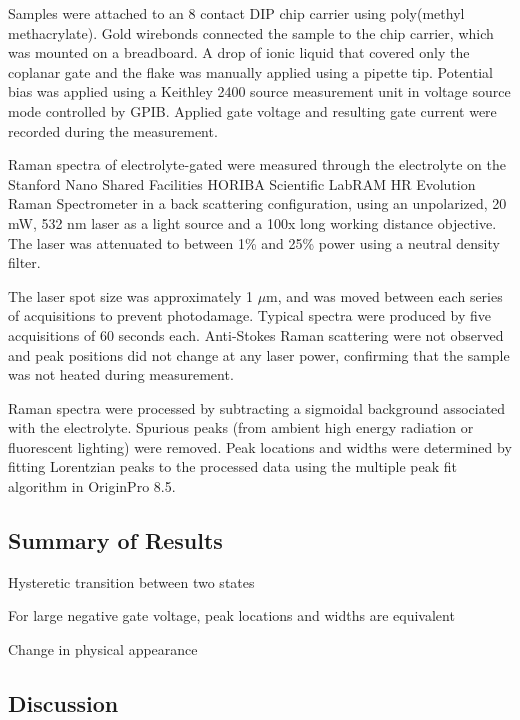 Samples were attached to an 8 contact DIP chip carrier using poly(methyl methacrylate). Gold wirebonds connected the sample to the chip carrier, which was mounted on a breadboard. A drop of ionic liquid that covered only the coplanar gate and the \rucl flake was manually applied using a pipette tip. Potential bias was applied using a Keithley 2400 source measurement unit in voltage source mode controlled by GPIB. Applied gate voltage and resulting gate current were recorded during the measurement.

Raman spectra of electrolyte-gated \rucl were measured through the electrolyte on the Stanford Nano Shared Facilities HORIBA Scientific LabRAM HR Evolution Raman Spectrometer in a back scattering configuration, using an unpolarized, 20 mW, 532 nm laser as a light source and a 100x long working distance objective. The laser was attenuated to between 1\% and 25\% power using a neutral density filter.

The laser spot size was approximately 1 $\mu$m, and was moved between each series of acquisitions to prevent photodamage. Typical spectra were produced by five acquisitions of 60 seconds each. Anti-Stokes Raman scattering were not observed and peak positions did not change at any laser power, confirming that the sample was not heated during measurement.

Raman spectra were processed by subtracting a sigmoidal background associated with the electrolyte. Spurious peaks (from ambient high energy radiation or fluorescent lighting) were removed. Peak locations and widths were determined by fitting Lorentzian peaks to the processed data using the multiple peak fit algorithm in OriginPro 8.5.

\subsection{Summary of Results}
Hysteretic transition between two states

For large negative gate voltage, peak locations and widths are equivalent

Change in physical appearance





\subsection{Discussion}